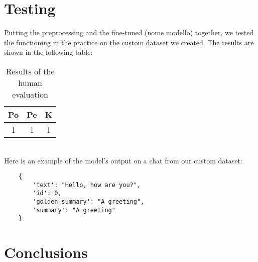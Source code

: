 \documentclass[10pt,twocolumn,letterpaper]{article}
\begin{document}
\section{Testing}
Putting the preprocessing and the fine-tuned (nome modello) together, we tested the functioning in the practice on the custom dataset we created. The results are shown in the following table:
\begin{table}[h!]
    \centering
    \begin{tabular}{|c|c|c|}
        \hline
        \rowcolor{lightergray}
        Po & Pe & K \\ 
        \hline
        1 & 1 & 1 \\
        \hline
    \end{tabular}
\caption{Results of the human evaluation}
\label{table:example}
\end{table} \\
Here is an example of the model’s output on a chat from our custom dataset:
\begin{lstlisting}
    {
        'text': "Hello, how are you?",
        'id': 0,
        'golden_summary': "A greeting",
        'summary': "A greeting"
    }
\end{lstlisting}
\section{Conclusions}





{\small


}
\end{document}
